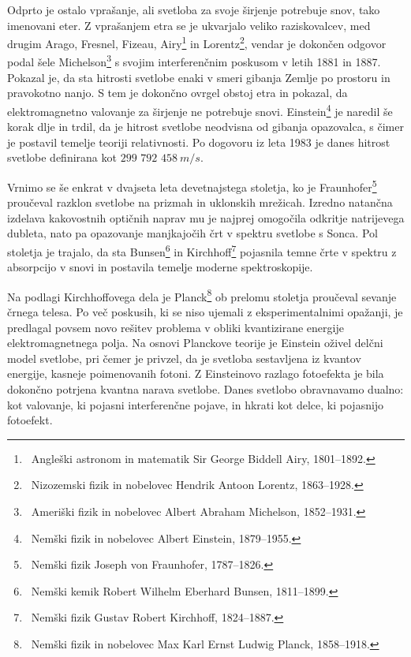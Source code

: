 Odprto je ostalo vprašanje, ali svetloba za svoje širjenje 
potrebuje snov, tako imenovani eter. Z vprašanjem etra se je 
ukvarjalo veliko raziskovalcev, med drugim Arago, Fresnel, Fizeau, 
   
 
Airy\footnote{~Angleški astronom in matematik Sir George Biddell Airy, 1801--1892.} 
in Lorentz\footnote{~Nizozemski fizik in nobelovec Hendrik Antoon Lorentz, 1863--1928.},
vendar je dokončen odgovor podal šele Michelson\footnote{~Ameriški fizik in nobelovec Albert
Abraham Michelson, 1852--1931.} s svojim 
interferenčnim poskusom v letih 1881 in 1887. Pokazal je, da
sta hitrosti svetlobe enaki v smeri gibanja Zemlje po prostoru in 
pravokotno nanjo. S tem je dokončno ovrgel obstoj etra in pokazal, 
da elektromagnetno valovanje za širjenje ne potrebuje snovi. 
Einstein\footnote{~Nemški fizik in nobelovec Albert Einstein, 1879--1955.} 
je naredil še korak dlje in trdil, da je hitrost 
svetlobe neodvisna od gibanja opazovalca, s čimer je postavil temelje 
teoriji relativnosti. Po dogovoru iz leta 1983 je danes 
hitrost svetlobe  definirana kot $299\,\,792\,\,458~\si{m/s}$. 

Vrnimo se še enkrat v dvajseta leta devetnajstega stoletja, ko je 
Fraunhofer\footnote{~Nemški fizik Joseph von Fraunhofer, 1787--1826.}
proučeval razklon svetlobe na prizmah in uklonskih mrežicah. Izredno
natančna izdelava kakovostnih optičnih naprav mu je najprej omogočila odkritje 
natrijevega dubleta, nato pa opazovanje manjkajočih črt v spektru
svetlobe s Sonca. Pol stoletja je trajalo, da 
sta Bunsen\footnote{~Nemški kemik Robert Wilhelm Eberhard Bunsen, 1811--1899.}
in Kirchhoff\footnote{~Nemški fizik Gustav Robert Kirchhoff, 1824--1887.}
pojasnila temne črte v spektru z absorpcijo v snovi in postavila temelje
moderne spektroskopije.

Na podlagi Kirchhoffovega dela je Planck\footnote{~Nemški fizik in nobelovec
Max Karl Ernst Ludwig Planck, 1858--1918.} ob prelomu stoletja
proučeval sevanje črnega telesa. Po več poskusih, ki se niso
ujemali z eksperimentalnimi opažanji, je predlagal povsem novo rešitev problema
v obliki kvantizirane energije elektromagnetnega polja. Na osnovi
Planckove teorije je Einstein oživel delčni model svetlobe, pri čemer
je privzel, da je svetloba sestavljena iz kvantov energije, kasneje 
poimenovanih fotoni. Z Einsteinovo razlago fotoefekta je bila dokončno
potrjena kvantna narava svetlobe. Danes svetlobo obravnavamo
dualno: kot valovanje, ki pojasni interferenčne 
pojave, in hkrati kot delce, ki pojasnijo fotoefekt.
